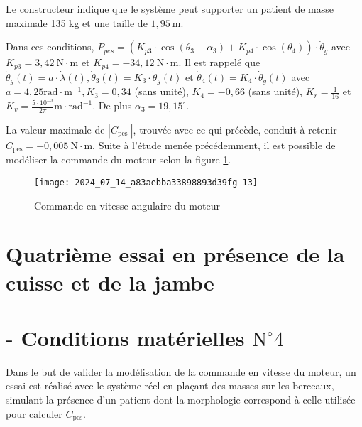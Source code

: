 Le constructeur indique que le système peut supporter un patient de masse maximale 135 kg et une taille de $1,95 \mathrm{~m}$.

Dans ces conditions, $P_{p e s}=\left(K_{p 3} \cdot \cos \left(\theta_{3}-\alpha_{3}\right)+K_{p 4} \cdot \cos \left(\theta_{4}\right)\right) \cdot \dot{\theta}_{g}$ avec $K_{p 3}=3,42 \mathrm{~N} \cdot \mathrm{m}$ et $K_{p 4}=-34,12 \mathrm{~N} \cdot \mathrm{m}$. Il est rappelé que $\dot{\theta}_{g}(t)=a \cdot \dot{\lambda}(t), \dot{\theta}_{3}(t)=K_{3} \cdot \dot{\theta}_{g}(t)$ et $\dot{\theta}_{4}(t)=K_{4} \cdot \dot{\theta}_{g}(t)$ avec $a=4,25 \mathrm{rad} \cdot \mathrm{m}^{-1}, K_{3}=0,34$ (sans unité), $K_{4}=-0,66$ (sans unité), $K_{r}=\frac{1}{16}$ et $K_{v}=\frac{5 \cdot 10^{-3}}{2 \pi} \mathrm{m} \cdot \mathrm{rad}^{-1}$. De plus $\alpha_{3}=19,15^{\circ}$.



La valeur maximale de $\left|C_{\text {pes }}\right|$, trouvée avec ce qui précède, conduit à retenir $C_{\mathrm{pes}}=-0,005 \mathrm{~N} \cdot \mathrm{m}$. Suite à l'étude menée précédemment, il est possible de modéliser la commande du moteur selon la figure \ref{fig:ccs_mp_2024:fig:21}.

\begin{figure}[!h]\centering
\texttt{[image: 2024\_07\_14\_a83aebba33898893d39fg-13]}

\caption{\label{fig:ccs_mp_2024:fig:21}Commande en vitesse angulaire du moteur}
\end{figure}
\section*{Quatrième essai en présence de la cuisse et de la jambe}
\section*{- Conditions matérielles $\mathrm{N}^{\circ} 4$}
Dans le but de valider la modélisation de la commande en vitesse du moteur, un essai est réalisé avec le système réel en plaçant des masses sur les berceaux, simulant la présence d'un patient dont la morphologie correspond à celle utilisée pour calculer $C_{\mathrm{pes}}$.


